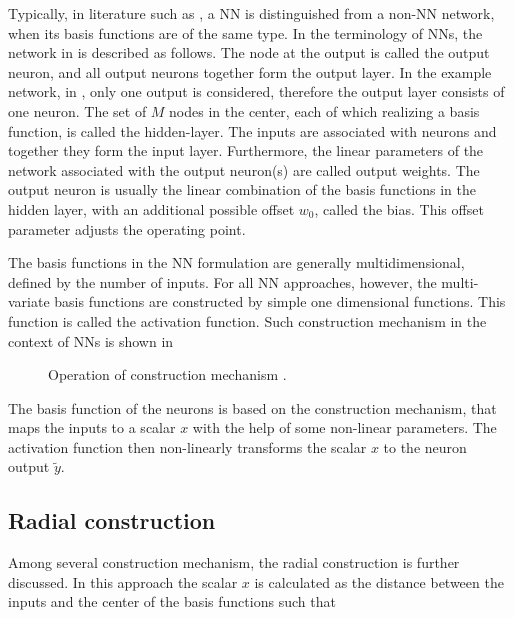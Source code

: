 Typically, in literature such as \cite{nelles2013nonlinear, norgaard2003neural}, a NN is distinguished from a non-NN network, when its basis functions are of the same type. In the terminology of NNs, the network in  is described as follows. The node at the output is called the output neuron, and all output neurons together form the output layer. In the example network, in , only one output is considered, therefore the output layer consists of one neuron. The set of $M$ nodes in the center, each of which realizing a basis function, is called the hidden-layer. The inputs are associated with neurons and together they form the input layer. Furthermore, the linear parameters of the network associated with the output neuron(s) are called output weights. The output neuron is usually the linear combination of the basis functions in the hidden layer, with an additional possible offset $w_0$, called the bias. This offset parameter adjusts the operating point. 

The basis functions in the NN formulation are generally multidimensional, defined by the number of inputs. For all NN approaches, however, the multi-variate basis functions are constructed by simple one dimensional functions\cite{nelles2013nonlinear}. This function is called the activation function. Such construction mechanism in the context of NNs is shown in 

\begin{figure}[H]
\centering
 
\caption{Operation of construction mechanism \cite{nelles2013nonlinear}.}
\label{fig:activation_mechanism}
\end{figure}

\vspace{-3mm}

The basis function of the neurons is based on the construction mechanism, that maps the inputs to a scalar $x$ with the help of some non-linear parameters. The activation function then non-linearly transforms the scalar $x$ to the neuron output $\tilde{y}$. 

\subsection{Radial construction}
\label{radial construction}

Among several construction mechanism, the radial construction is further discussed. In this approach the scalar $x$ is calculated as the distance between the inputs and the center of the basis functions such that 

